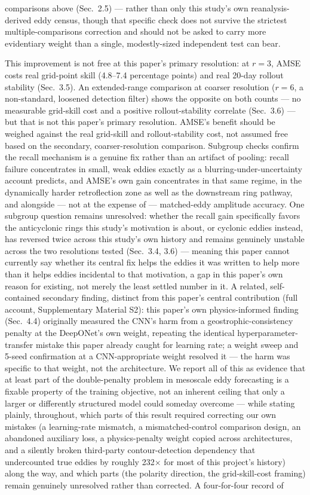 \documentclass[11pt]{article}
\begin{document}
comparisons above (Sec.~2.5) --- rather than only this study's own reanalysis-derived eddy census, though that specific check does not survive the strictest multiple-comparisons correction and should not be asked to carry more evidentiary weight than a single, modestly-sized independent test can bear.

This improvement is not free at this paper's primary resolution: at $r=3$, AMSE costs real grid-point skill (4.8--7.4 percentage points) and real 20-day rollout stability (Sec.~3.5). An extended-range comparison at coarser resolution ($r=6$, a non-standard, loosened detection filter) shows the opposite on both counts --- no measurable grid-skill cost and a positive rollout-stability correlate (Sec.~3.6) --- but that is not this paper's primary resolution. AMSE's benefit should be weighed against the real grid-skill and rollout-stability cost, not assumed free based on the secondary, coarser-resolution comparison. Subgroup checks confirm the recall mechanism is a genuine fix rather than an artifact of pooling: recall failure concentrates in small, weak eddies exactly as a blurring-under-uncertainty account predicts, and AMSE's own gain concentrates in that same regime, in the dynamically harder retroflection zone as well as the downstream ring pathway, and alongside --- not at the expense of --- matched-eddy amplitude accuracy. One subgroup question remains unresolved: whether the recall gain specifically favors the anticyclonic rings this study's motivation is about, or cyclonic eddies instead, has reversed twice across this study's own history and remains genuinely unstable across the two resolutions tested (Sec.~3.4, 3.6) --- meaning this paper cannot currently say whether its central fix helps the eddies it was written to help more than it helps eddies incidental to that motivation, a gap in this paper's own reason for existing, not merely the least settled number in it. A related, self-contained secondary finding, distinct from this paper's central contribution (full account, Supplementary Material S2): this paper's own physics-informed finding (Sec.~4.4) originally measured the CNN's harm from a geostrophic-consistency penalty at the DeepONet's own weight, repeating the identical hyperparameter-transfer mistake this paper already caught for learning rate; a weight sweep and 5-seed confirmation at a CNN-appropriate weight resolved it --- the harm was specific to that weight, not the architecture. We report all of this as evidence that at least part of the double-penalty problem in mesoscale eddy forecasting is a fixable property of the training objective, not an inherent ceiling that only a larger or differently structured model could someday overcome --- while stating plainly, throughout, which parts of this result required correcting our own mistakes (a learning-rate mismatch, a mismatched-control comparison design, an abandoned auxiliary loss, a physics-penalty weight copied across architectures, and a silently broken third-party contour-detection dependency that undercounted true eddies by roughly 232$\times$ for most of this project's history) along the way, and which parts (the polarity direction, the grid-skill-cost framing) remain genuinely unresolved rather than corrected. A four-for-four record of 
\end{document}
